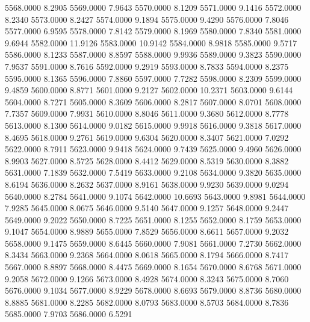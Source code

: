 5568.0000      8.2905
5569.0000      7.9643
5570.0000      8.1209
5571.0000      9.1416
5572.0000      8.2340
5573.0000      8.2427
5574.0000      9.1894
5575.0000      9.4290
5576.0000      7.8046
5577.0000      6.9595
5578.0000      7.8142
5579.0000      8.1969
5580.0000      7.8340
5581.0000      9.6944
5582.0000     11.9126
5583.0000     10.9142
5584.0000      8.9818
5585.0000      9.5717
5586.0000      8.1233
5587.0000      8.8597
5588.0000      9.9936
5589.0000      9.3823
5590.0000      7.9537
5591.0000      8.7616
5592.0000      9.2919
5593.0000      8.7833
5594.0000      8.2375
5595.0000      8.1365
5596.0000      7.8860
5597.0000      7.7282
5598.0000      8.2309
5599.0000      9.4859
5600.0000      8.8771
5601.0000      9.2127
5602.0000     10.2371
5603.0000      9.6144
5604.0000      8.7271
5605.0000      8.3609
5606.0000      8.2817
5607.0000      8.0701
5608.0000      7.7357
5609.0000      7.9931
5610.0000      8.8046
5611.0000      9.3680
5612.0000      8.7778
5613.0000      8.1300
5614.0000      9.0182
5615.0000      9.9918
5616.0000      9.3818
5617.0000      8.4695
5618.0000      9.2761
5619.0000      9.6304
5620.0000      8.3407
5621.0000      7.0292
5622.0000      8.7911
5623.0000      9.9418
5624.0000      9.7439
5625.0000      9.4960
5626.0000      8.9903
5627.0000      8.5725
5628.0000      8.4412
5629.0000      8.5319
5630.0000      8.3882
5631.0000      7.1839
5632.0000      7.5419
5633.0000      9.2108
5634.0000      9.3820
5635.0000      8.6194
5636.0000      8.2632
5637.0000      8.9161
5638.0000      9.9230
5639.0000      9.0294
5640.0000      8.2784
5641.0000      9.1074
5642.0000     10.6693
5643.0000      9.8981
5644.0000      7.9285
5645.0000      8.0675
5646.0000      9.5140
5647.0000      9.1257
5648.0000      9.2447
5649.0000      9.2022
5650.0000      8.7225
5651.0000      8.1255
5652.0000      8.1759
5653.0000      9.1047
5654.0000      8.9889
5655.0000      7.8529
5656.0000      8.6611
5657.0000      9.2032
5658.0000      9.1475
5659.0000      8.6445
5660.0000      7.9081
5661.0000      7.2730
5662.0000      8.3434
5663.0000      9.2368
5664.0000      8.0618
5665.0000      8.1794
5666.0000      8.7417
5667.0000      8.8897
5668.0000      8.4475
5669.0000      8.1654
5670.0000      8.6768
5671.0000      9.2058
5672.0000      9.1266
5673.0000      8.4928
5674.0000      8.3243
5675.0000      8.7060
5676.0000      9.1034
5677.0000      8.9229
5678.0000      8.6693
5679.0000      8.8736
5680.0000      8.8885
5681.0000      8.2285
5682.0000      8.0793
5683.0000      8.5703
5684.0000      8.7836
5685.0000      7.9703
5686.0000      6.5291
